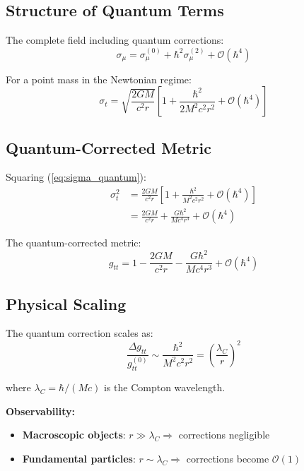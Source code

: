 \documentclass[11pt,a4paper]{article}
\theoremstyle{definition}
\theoremstyle{remark}
\begin{document}
	\subsection{Structure of Quantum Terms}
	
	The complete field including quantum corrections:
	\begin{equation}
		\sigma_\mu = \sigma_\mu^{(0)} + \hbar^2\sigma_\mu^{(2)} + \mathcal{O}(\hbar^4)
	\end{equation}
	
	For a point mass in the Newtonian regime:
	\begin{equation}\label{eq:sigma_quantum}
		\boxed{\sigma_t = \sqrt{\frac{2GM}{c^2r}}\left[1 + \frac{\hbar^2}{2M^2c^2r^2} + \mathcal{O}(\hbar^4)\right]}
	\end{equation}
	
	\subsection{Quantum-Corrected Metric}
	
	Squaring (\ref{eq:sigma_quantum}):
	\begin{align}
		\sigma_t^2 &= \frac{2GM}{c^2r}\left[1 + \frac{\hbar^2}{M^2c^2r^2} + \mathcal{O}(\hbar^4)\right]\\
		&= \frac{2GM}{c^2r} + \frac{G\hbar^2}{Mc^4r^3} + \mathcal{O}(\hbar^4)
	\end{align}
	
	The quantum-corrected metric:
	\begin{equation}\label{eq:metric_quantum}
		\boxed{g_{tt} = 1 - \frac{2GM}{c^2r} - \frac{G\hbar^2}{Mc^4r^3} + \mathcal{O}(\hbar^4)}
	\end{equation}
	
	\subsection{Physical Scaling}
	
	The quantum correction scales as:
	\begin{equation}
		\frac{\Delta g_{tt}}{g_{tt}^{(0)}} \sim \frac{\hbar^2}{M^2c^2r^2} = \left(\frac{\lambda_C}{r}\right)^2
	\end{equation}
	
	where $\lambda_C = \hbar/(Mc)$ is the Compton wavelength.
	
	\textbf{Observability:}
	\begin{itemize}
		\item \textbf{Macroscopic objects}: $r \gg \lambda_C \Rightarrow$ corrections negligible
		\item \textbf{Fundamental particles}: $r \sim \lambda_C \Rightarrow$ corrections become $\mathcal{O}(1)$
	\end{itemize}
	
\end{document}
